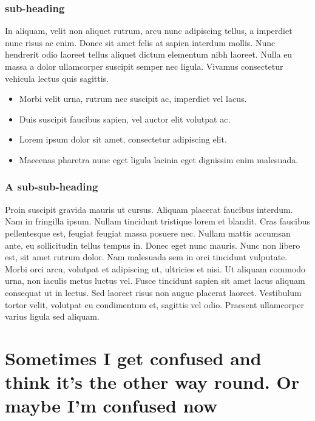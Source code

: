 \documentclass[11pt,oneside,openany]{book}
\begin{document}
\subsubsection{sub-heading}\hypertarget{sub-heading}{}\label{sub-heading}

In aliquam, velit non aliquet rutrum, arcu nunc adipiscing tellus, a imperdiet nunc risus ac enim. Donec sit amet felis at sapien interdum mollis. Nunc hendrerit odio laoreet tellus aliquet dictum elementum nibh laoreet. Nulla eu massa a dolor ullamcorper suscipit semper nec ligula. Vivamus consectetur vehicula lectus quis sagittis.

\begin{itemize}
\item Morbi velit urna, rutrum nec suscipit ac, imperdiet vel lacus.
\item Duis suscipit faucibus sapien, vel auctor elit volutpat ac.
\item Lorem ipsum dolor sit amet, consectetur adipiscing elit.
\item Maecenas pharetra nunc eget ligula lacinia eget dignissim enim malesuada.
\end{itemize}

\subsubsection{A sub-sub-heading}\hypertarget{a-sub-sub-heading}{}\label{a-sub-sub-heading}

Proin suscipit gravida mauris ut cursus. Aliquam placerat faucibus interdum. Nam in fringilla ipsum. Nullam tincidunt tristique lorem et blandit. Cras faucibus pellentesque est, feugiat feugiat massa posuere nec. Nullam mattis accumsan ante, eu sollicitudin tellus tempus in. Donec eget nunc mauris. Nunc non libero est, sit amet rutrum dolor. Nam malesuada sem in orci tincidunt vulputate. Morbi orci arcu, volutpat et adipiscing ut, ultricies et nisi. Ut aliquam commodo urna, non iaculis metus luctus vel. Fusce tincidunt sapien sit amet lacus aliquam consequat ut in lectus. Sed laoreet risus non augue placerat laoreet. Vestibulum tortor velit, volutpat eu condimentum et, sagittis vel odio. Praesent ullamcorper varius ligula sed aliquam.

\section{Sometimes I get confused and think it's the other way round. Or maybe I'm confused now}\hypertarget{sometimes-i-get-confused-and-think-its-the-other-way-round-or-maybe-im-confused-now}{}\label{sometimes-i-get-confused-and-think-its-the-other-way-round-or-maybe-im-confused-now}
\end{document}
